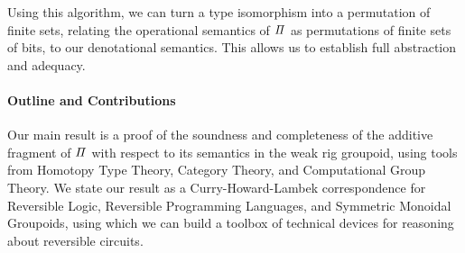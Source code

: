 Using this algorithm, we can turn a type isomorphism into a permutation of finite sets, relating the operational
semantics of $\mathit{\Pi}$ as permutations of finite sets of bits, to our denotational semantics. This allows us to
establish full abstraction and adequacy.

\paragraph{Outline and Contributions} Our main result is a proof of the soundness and completeness of the additive
fragment of $\mathit{\Pi}$ with respect to its semantics in the weak rig groupoid, using tools from Homotopy Type Theory,
Category Theory, and Computational Group Theory. We state our result as a Curry-Howard-Lambek correspondence for
Reversible Logic, Reversible Programming Languages, and Symmetric Monoidal Groupoids, using which we can build a toolbox
of technical devices for reasoning about reversible circuits.

